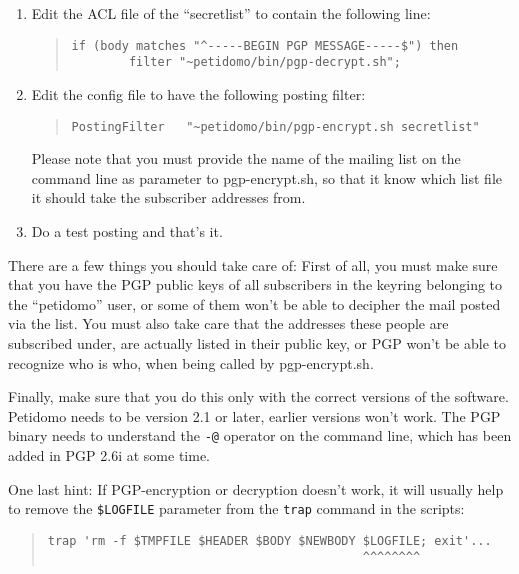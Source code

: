 \documentclass[a4paper,11pt]{scrreprt}
\newcommand{\file}[1]{{\textsf{#1}}}
\begin{document}
\begin{enumerate}
\item Edit the ACL file of the ``secretlist'' to contain the following
line:

\begin{quote}
\begin{verbatim}
if (body matches "^-----BEGIN PGP MESSAGE-----$") then
        filter "~petidomo/bin/pgp-decrypt.sh";
\end{verbatim}
\end{quote}

\item Edit the config file to have the following posting filter:

\begin{quote}
\begin{verbatim}
PostingFilter   "~petidomo/bin/pgp-encrypt.sh secretlist"
\end{verbatim}
\end{quote}

Please note that you must provide the name of the mailing list on the
command line as parameter to \file{pgp-encrypt.sh}, so that it know
which list file it should take the subscriber addresses from.

\item Do a test posting and that's it.

\end{enumerate}

There are a few things you should take care of: First of all, you must
make sure that you have the PGP public keys of all subscribers in the
keyring belonging to the ``petidomo'' user, or some of them won't be
able to decipher the mail posted via the list. You must also take care
that the addresses these people are subscribed under, are actually
listed in their public key, or PGP won't be able to recognize who is
who, when being called by \file{pgp-encrypt.sh}.

Finally, make sure that you do this only with the correct versions of
the software. Petidomo needs to be version 2.1 or later, earlier
versions won't work. The PGP binary needs to understand the {\texttt{-@}}
operator on the command line, which has been added in PGP 2.6i at some
time.

One last hint: If PGP-encryption or decryption doesn't work, it will usually
help to remove the {\texttt{\$LOGFILE}} parameter from the {\texttt{trap}}
command in the scripts:

\begin{quote}
\begin{verbatim}
trap 'rm -f $TMPFILE $HEADER $BODY $NEWBODY $LOGFILE; exit'...
                                            ^^^^^^^^
\end{verbatim}
\end{quote}
\end{document}
